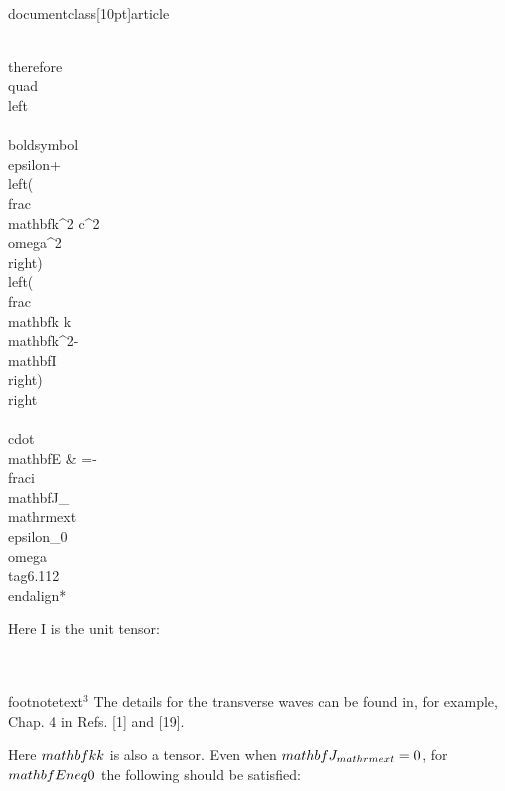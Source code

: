 \\documentclass[10pt]{article}
\begin{document}
{{{{\\therefore \\quad\\left\\{\\boldsymbol{\\epsilon}+\\left(\\frac{\\mathbf{k}^{2} c^{2}}{\\omega^{2}}\\right)\\left(\\frac{\\mathbf{k k}}{\\mathbf{k}^{2}}-\\mathbf{I}\\right)\\right\\} \\cdot \\mathbf{E} & =-\\frac{i \\mathbf{J}_{\\mathrm{ext}}}{\\epsilon_{0} \\omega} \\tag{6.112}
\\end{align*}


Here I is the unit tensor:

\\[
\\mathbf{I} \\equiv\\left(\\begin{array}{lll}
1 & 0 & 0  \\tag{6.113}\\\\
0 & 1 & 0 \\\\
0 & 0 & 1
\\end{array}\\right)
\\]
\\footnotetext{${ }^{3}$ The details for the transverse waves can be found in, for example, Chap. 4 in Refs. [1] and [19].
}

Here $\\mathbf{k k}$ is also a tensor. Even when $\\mathbf{J}_{\\mathrm{ext}}=0$, for $\\mathbf{E} \\neq 0$ the following should be satisfied:


}}}}
\end{document}
